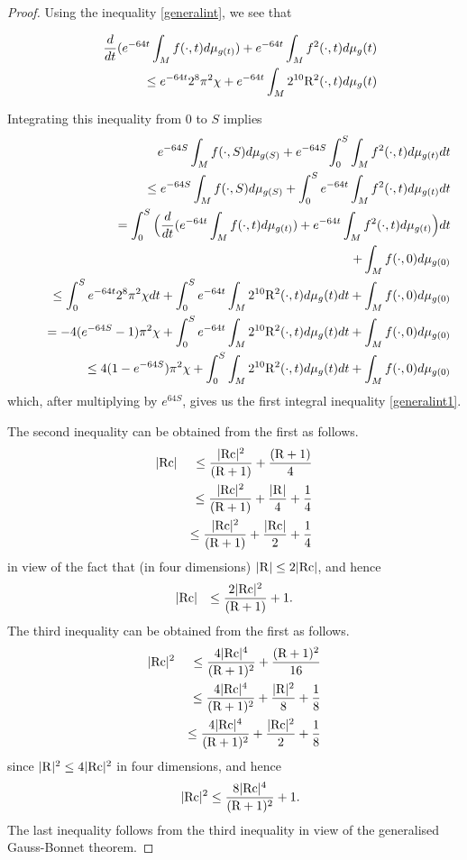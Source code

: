 \documentclass{amsart}
\numberwithin{equation}{section}
\theoremstyle{definition}
\theoremstyle{remark}
\begin{document}
\begin{proof}
Using the inequality  \eqref{generalint}, we see that

\begin{eqnarray}
&&{\frac{d}{d t}} (e^{-64t}\int_M  f(\cdot,t) d\mu_{g(t)} ) + e^{-64t}\int_M
f^2(\cdot,t) d\mu_g(t) \cr
&& \ \ \ \ \ \leq
e^{-64t}2^8 \pi^2 \chi + e^{-64t}\int_M  2^{10} {{\rm R}}^2(\cdot,t)  d\mu_g(t)
\end{eqnarray}

Integrating this inequality from $0$ to $S$ implies
\begin{eqnarray}
&&e^{-64S}\int_M  f(\cdot,S) d\mu_{g(S)}  +  e^{-64S} \int_0^S\int_M
f^2(\cdot,t) d\mu_{g(t)} dt\cr
&&\ \ \ \  \leq e^{-64S}\int_M  f(\cdot,S) d\mu_{g(S)}  +  \int_0^S e^{-64t}\int_M
f^2(\cdot,t) d\mu_{g(t)} dt\cr
&& \ \ \ \  = \int_0^S \Big( {\frac{d}{d t}} (e^{-64t}\int_M  f(\cdot,t)
d\mu_{g(t)} )
+e^{-64t}\int_M f^2(\cdot,t) d\mu_{g(t)} \Big)dt \cr
&& \ \ \ \ \ \ + \int_M  f(\cdot,0) d\mu_{g(0)}  \cr
&& \ \ \ \ \leq
\int_{0}^S e^{-64t}2^8 \pi^2 \chi dt+\int_0^S e^{-64t}\int_M  2^{10}
{{\rm R}}^2(\cdot,t)  d\mu_g(t) dt + \int_M  f(\cdot,0) d\mu_{g(0)}  \cr
&& \ \ \ \ = -4(e^{-64S} - 1) \pi^2 \chi  +\int_0^S e^{-64t}\int_M  2^{10}
{{\rm R}}^2(\cdot,t)    d\mu_g(t) dt  + \int_M  f(\cdot,0) d\mu_{g(0)}   \cr
&& \ \ \ \ \leq 4(1-e^{-64S} ) \pi^2 \chi  +\int_0^S \int_M  2^{10}
{{\rm R}}^2 (\cdot,t)  d\mu_g(t) dt + \int_M  f(\cdot,0) d\mu_{g(0)} 
\end{eqnarray}
which, after multiplying by $e^{64S}$, gives us 
 the first integral inequality \eqref{generalint1}.
 

The second inequality can be obtained from the first as follows.
 \begin{eqnarray}
|{{\rm{Rc}}}| && \leq \frac{|{{\rm{Rc}}}|^2}{({{\rm R}} +1)} + \frac{({{\rm R}} + 1)}{4} \cr
&&\leq \frac{|{{\rm{Rc}}}|^2}{({{\rm R}} +1)} + \frac{|{{\rm R}}|}{4} + \frac{1}{4} \cr
&& \leq  \frac{|{{\rm{Rc}}}|^2}{({{\rm R}} +1)}  + \frac{|{{\rm{Rc}}}|}{2} +  \frac{1}{4} 
\end{eqnarray}
in view of the fact that (in four dimensions) $|{{\rm R}}| \leq 2 |{{\rm{Rc}}}|$,
and hence
\begin{eqnarray}
|{{\rm{Rc}}}|  && \leq  \frac{2|{{\rm{Rc}}}|^2}{({{\rm R}} +1)}  +1.
\end{eqnarray}
The third inequality can be obtained from the first as follows.
\begin{eqnarray}
|{{\rm{Rc}}}|^2 && \leq \frac{4|{{\rm{Rc}}}|^4}{({{\rm R}} +1)^2} + \frac{({{\rm R}} + 1)^2}{16} \cr
&&\leq \frac{4|{{\rm{Rc}}}|^4}{({{\rm R}} +1)^2} + \frac{|{{\rm R}}|^2}{8} + \frac{1}{8} \cr
&& \leq \frac{4|{{\rm{Rc}}}|^4}{({{\rm R}} +1)^2} + \frac{|{{\rm{Rc}}}|^2}{2} + \frac{1}{8}
\end{eqnarray}
since 
$|{{\rm R}}|^2 \leq 4 |{{\rm{Rc}}}|^2 $ in four dimensions, and hence
\begin{eqnarray*}
&&|{{\rm{Rc}}}|^2  \leq \frac{8|{{\rm{Rc}}}|^4}{({{\rm R}} + 1)^2} + 1.
\end{eqnarray*}
The last inequality follows from the third inequality in view of the
generalised Gauss-Bonnet theorem.
\end{proof}
\end{document}
